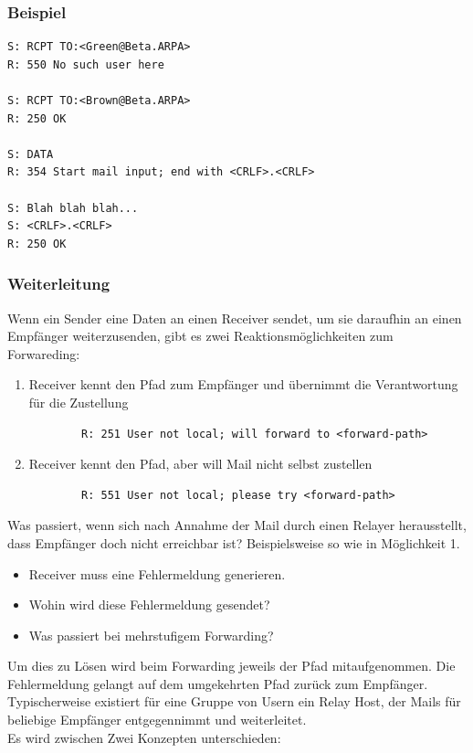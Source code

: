\documentclass{article} %
\begin{document}
\subsubsection{Beispiel}	
	\begin{verbatim}
S: RCPT TO:<Green@Beta.ARPA> 
R: 550 No such user here 

S: RCPT TO:<Brown@Beta.ARPA> 
R: 250 OK 

S: DATA 
R: 354 Start mail input; end with <CRLF>.<CRLF> 

S: Blah blah blah... 
S: <CRLF>.<CRLF> 
R: 250 OK 
	\end{verbatim}

\subsubsection{Weiterleitung}
Wenn ein Sender eine Daten an einen Receiver sendet, um sie daraufhin an einen Empfänger weiterzusenden, gibt es zwei Reaktionsmöglichkeiten zum Forwareding:
	\begin{enumerate}
	\item  Receiver kennt den Pfad zum Empfänger und übernimmt die Verantwortung für die Zustellung
		\begin{verbatim}
		R: 251 User not local; will forward to <forward-path>
		\end{verbatim}
	\item  Receiver kennt den Pfad, aber will Mail nicht selbst zustellen
		\begin{verbatim}
		R: 551 User not local; please try <forward-path>
		\end{verbatim}
	\end{enumerate}
Was passiert, wenn sich nach Annahme der Mail durch einen Relayer herausstellt, dass Empfänger doch nicht erreichbar ist? Beispielsweise so wie in Möglichkeit 1.
	\begin{itemize}
	\item Receiver muss eine Fehlermeldung generieren. 
	\item Wohin wird diese Fehlermeldung gesendet? 
	\item Was passiert bei mehrstufigem Forwarding? 
	\end{itemize}
Um dies zu Lösen wird beim Forwarding jeweils der Pfad mitaufgenommen. Die Fehlermeldung gelangt auf dem umgekehrten Pfad zurück zum Empfänger. Typischerweise existiert für eine Gruppe von Usern ein Relay Host, der Mails für beliebige Empfänger entgegennimmt und weiterleitet.\\
Es wird zwischen Zwei Konzepten unterschieden:
\end{document}
